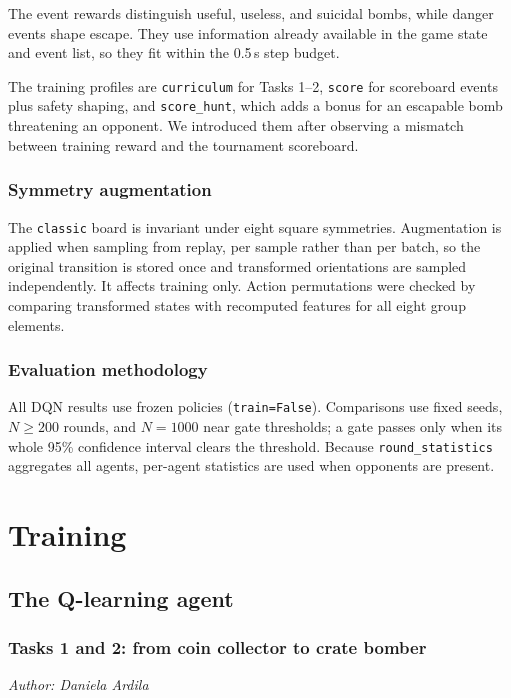 \documentclass[11pt]{article}
\newcommand{\authorline}[1]{\noindent\textit{Author: #1}\par\medskip}
\newcommand{\code}[1]{\texttt{#1}}
\begin{document}
The event rewards distinguish useful, useless, and suicidal bombs, while danger events shape
escape. They use information already available in the game state and event list, so they fit
within the 0.5\,s step budget.

The training profiles are \code{curriculum} for Tasks 1--2, \code{score} for scoreboard
events plus safety shaping, and \code{score\_hunt}, which adds a bonus for an escapable bomb
threatening an opponent. We introduced them after observing a mismatch between training
reward and the tournament scoreboard.

\subsubsection{Symmetry augmentation}

The \code{classic} board is invariant under eight square symmetries. Augmentation is applied
when sampling from replay, per sample rather than per batch, so the original transition is
stored once and transformed orientations are sampled independently. It affects training
only. Action permutations were checked by comparing transformed states with recomputed
features for all eight group elements.

\subsubsection{Evaluation methodology}

All DQN results use frozen policies (\code{train=False}). Comparisons use fixed seeds,
$N \geq 200$ rounds, and $N=1000$ near gate thresholds; a gate passes only when its whole
95\% confidence interval clears the threshold. Because \code{round\_statistics} aggregates
all agents, per-agent statistics are used when opponents are present.

\section{Training}
\subsection{The Q-learning agent}
\label{sec:training-qagent}
 
\subsubsection{Tasks 1 and 2: from coin collector to crate bomber}
\label{sec:q-task12}
\authorline{Daniela Ardila}
 
\end{document}
